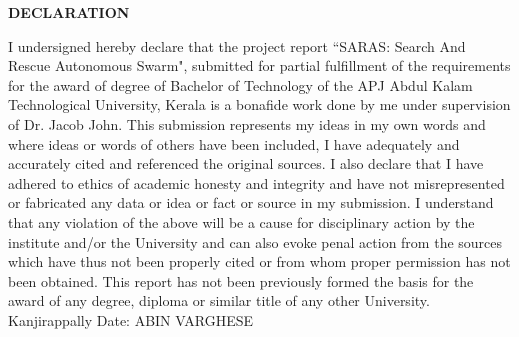 \begin{titlepage}
\begin{center} 
\textbf {\Large{DECLARATION}} 
\end{center}
I undersigned hereby declare that the project report ``SARAS: Search And Rescue Autonomous Swarm", submitted for partial fulfillment of the requirements for the award of degree of Bachelor of Technology of
the APJ Abdul Kalam Technological University, Kerala is a bonafide work done by me
under supervision of Dr. Jacob John. This submission represents my ideas in
my own words and where ideas or words of others have been included, I have adequately
and accurately cited and referenced the original sources. I also declare that I have
adhered to ethics of academic honesty and integrity and have not misrepresented or
fabricated any data or idea or fact or source in my submission. I understand that any
violation of the above will be a cause for disciplinary action by the institute and/or the
University and can also evoke penal action from the sources which have thus not been
properly cited or from whom proper permission has not been obtained. This report has
not been previously formed the basis for the award of any degree, diploma or similar title
of any other University.
\vspace{20pt}
\newline  Kanjirappally
\vspace{1pt}
\newline Date: \hspace{320pt} 
\newline \vspace{1pt} \hspace{320pt} ABIN VARGHESE
\end{titlepage}
